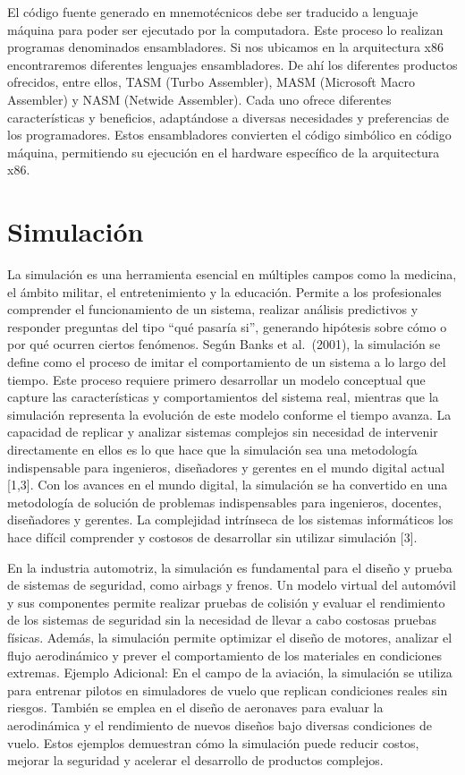 \documentclass[12pt,twoside]{templates/unerthesis}
\begin{document}
El código fuente generado en mnemotécnicos debe ser traducido a lenguaje máquina para poder ser ejecutado por la computadora. Este proceso lo realizan programas denominados ensambladores. Si nos ubicamos en la arquitectura x86 encontraremos diferentes lenguajes ensambladores. De ahí los diferentes productos ofrecidos, entre ellos, TASM (Turbo Assembler), MASM (Microsoft Macro Assembler) y NASM (Netwide Assembler). Cada uno ofrece diferentes características y beneficios, adaptándose a diversas necesidades y preferencias de los programadores. Estos ensambladores convierten el código simbólico en código máquina, permitiendo su ejecución en el hardware específico de la arquitectura x86.

\hypertarget{simulaciuxf3n}{%
\section{Simulación}\label{simulaciuxf3n}}

La simulación es una herramienta esencial en múltiples campos como la medicina, el ámbito militar, el entretenimiento y la educación. Permite a los profesionales comprender el funcionamiento de un sistema, realizar análisis predictivos y responder preguntas del tipo ``qué pasaría si'', generando hipótesis sobre cómo o por qué ocurren ciertos fenómenos. Según Banks et al.~(2001), la simulación se define como el proceso de imitar el comportamiento de un sistema a lo largo del tiempo. Este proceso requiere primero desarrollar un modelo conceptual que capture las características y comportamientos del sistema real, mientras que la simulación representa la evolución de este modelo conforme el tiempo avanza. La capacidad de replicar y analizar sistemas complejos sin necesidad de intervenir directamente en ellos es lo que hace que la simulación sea una metodología indispensable para ingenieros, diseñadores y gerentes en el mundo digital actual {[}1,3{]}.
Con los avances en el mundo digital, la simulación se ha convertido en una metodología de solución de problemas indispensables para ingenieros, docentes, diseñadores y gerentes. La complejidad intrínseca de los sistemas informáticos los hace difícil comprender y costosos de desarrollar sin utilizar simulación {[}3{]}.

En la industria automotriz, la simulación es fundamental para el diseño y prueba de sistemas de seguridad, como airbags y frenos. Un modelo virtual del automóvil y sus componentes permite realizar pruebas de colisión y evaluar el rendimiento de los sistemas de seguridad sin la necesidad de llevar a cabo costosas pruebas físicas. Además, la simulación permite optimizar el diseño de motores, analizar el flujo aerodinámico y prever el comportamiento de los materiales en condiciones extremas.
Ejemplo Adicional:
En el campo de la aviación, la simulación se utiliza para entrenar pilotos en simuladores de vuelo que replican condiciones reales sin riesgos. También se emplea en el diseño de aeronaves para evaluar la aerodinámica y el rendimiento de nuevos diseños bajo diversas condiciones de vuelo. Estos ejemplos demuestran cómo la simulación puede reducir costos, mejorar la seguridad y acelerar el desarrollo de productos complejos.
\end{document}
